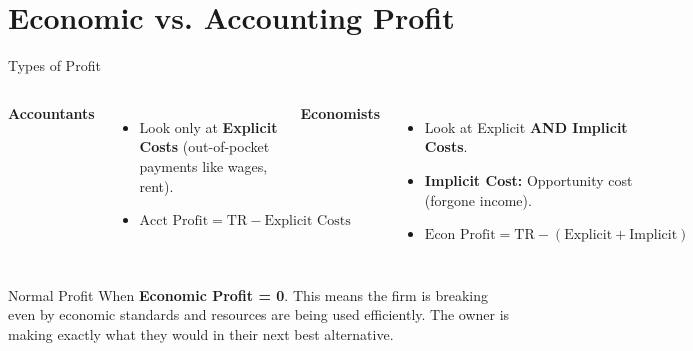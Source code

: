 \documentclass[aspectratio=169]{beamer}
\begin{document}
\section{Economic vs. Accounting Profit}

\begin{frame}{Types of Profit}
    \begin{columns}
        \textbf{Accountants}
        \begin{itemize}
            \item Look only at \textbf{Explicit Costs} (out-of-pocket payments like wages, rent).
            \item $ \text{Acct Profit} = \text{TR} - \text{Explicit Costs} $
        \end{itemize}
        
        \textbf{Economists}
        \begin{itemize}
            \item Look at Explicit \textbf{AND Implicit Costs}.
            \item \textbf{Implicit Cost:} Opportunity cost (forgone income).
            \item $ \text{Econ Profit} = \text{TR} - (\text{Explicit} + \text{Implicit}) $
        \end{itemize}
    \end{columns}
    
    \vspace{0.5cm}
    \begin{alertblock}{Normal Profit}
        When \textbf{Economic Profit = 0}. This means the firm is breaking even by economic standards and resources are being used efficiently. The owner is making exactly what they would in their next best alternative.
    \end{alertblock}
\end{frame}
\end{document}
